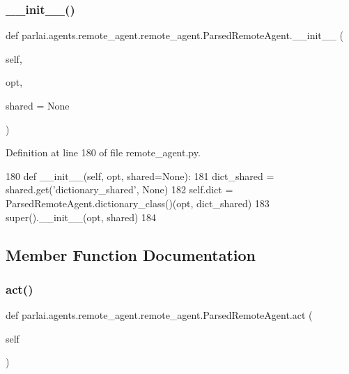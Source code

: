 \subsubsection{\texorpdfstring{\+\_\+\+\_\+init\+\_\+\+\_\+()}{\_\_init\_\_()}}
{\footnotesize\ttfamily def parlai.\+agents.\+remote\+\_\+agent.\+remote\+\_\+agent.\+Parsed\+Remote\+Agent.\+\_\+\+\_\+init\+\_\+\+\_\+ (\begin{DoxyParamCaption}\item[{}]{self,  }\item[{}]{opt,  }\item[{}]{shared = {\ttfamily None} }\end{DoxyParamCaption})}



Definition at line 180 of file remote\+\_\+agent.\+py.


\begin{DoxyCode}
180     \textcolor{keyword}{def }\_\_init\_\_(self, opt, shared=None):
181         dict\_shared = shared.get(\textcolor{stringliteral}{'dictionary\_shared'}, \textcolor{keywordtype}{None})
182         self.dict = ParsedRemoteAgent.dictionary\_class()(opt, dict\_shared)
183         super().\_\_init\_\_(opt, shared)
184 
\end{DoxyCode}


\subsection{Member Function Documentation}
\mbox{\label{classparlai_1_1agents_1_1remote__agent_1_1remote__agent_1_1ParsedRemoteAgent_a7eb6a8cdcffb425506e085c4bef07a85}} 
\subsubsection{\texorpdfstring{act()}{act()}}
{\footnotesize\ttfamily def parlai.\+agents.\+remote\+\_\+agent.\+remote\+\_\+agent.\+Parsed\+Remote\+Agent.\+act (\begin{DoxyParamCaption}\item[{}]{self }\end{DoxyParamCaption})}



